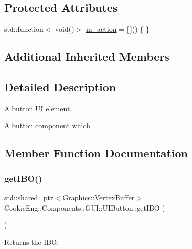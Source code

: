 \subsection*{Protected Attributes}
\begin{DoxyCompactItemize}
\item 
std\+::function$<$ void()$>$ \hyperlink{class_cookie_eng_1_1_components_1_1_g_u_i_1_1_u_i_button_a3ced1fe752313f5ae05c82e67c621bf4}{m\+\_\+action} = \mbox{[}$\,$\mbox{]}() \{ \}
\end{DoxyCompactItemize}
\subsection*{Additional Inherited Members}


\subsection{Detailed Description}
A button UI element. 

A button component which 

\subsection{Member Function Documentation}
\mbox{\label{class_cookie_eng_1_1_components_1_1_g_u_i_1_1_u_i_button_a4ba5f52cb1775770b24e2ec0e9207ed4}} 
\subsubsection{\texorpdfstring{get\+I\+B\+O()}{getIBO()}}
{\footnotesize\ttfamily std\+::shared\+\_\+ptr$<$\hyperlink{class_cookie_eng_1_1_graphics_1_1_vertex_buffer}{Graphics\+::\+Vertex\+Buffer}$>$ Cookie\+Eng\+::\+Components\+::\+G\+U\+I\+::\+U\+I\+Button\+::get\+I\+BO (\begin{DoxyParamCaption}{ }\end{DoxyParamCaption})\hspace{0.3cm}{\ttfamily [inline]}}



Returns the I\+BO. 

